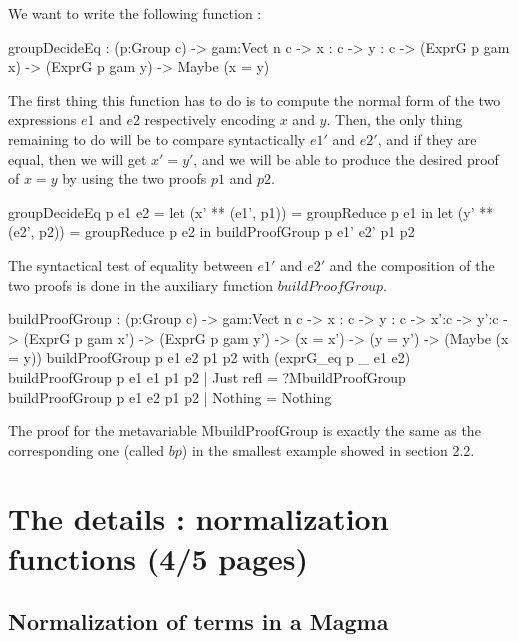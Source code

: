 \documentclass{sigplanconf}
\begin{document}
We want to write the following function :
\begin{code}[caption=Type of the function for deciding equality between elements in a Group, captionpos=b, label=lst1:haskell2]
	groupDecideEq : (p:Group c) 
	   -> {gam:Vect n c} -> {x : c} -> {y : c} 
	   -> (ExprG p gam x) -> (ExprG p gam y) 
	   -> Maybe (x = y)
\end{code}

The first thing this function has to do is to compute the normal form of the two expressions $e1$ and $e2$ respectively encoding $x$ and $y$.
Then, the only thing remaining to do will be to compare syntactically $e1'$ and $e2'$, and if they are equal, then we will get $x'=y'$, and we will be able to produce the desired proof of $x=y$ by using the two proofs $p1$ and $p2$. 

\begin{code}[caption=Decides if two elements of a group are equal, captionpos=b, label=lst1:haskell2]
groupDecideEq p e1 e2 =
  let (x' ** (e1', p1)) = 
    groupReduce p e1 in
  let (y' ** (e2', p2)) = 
    groupReduce p e2 in
	     buildProofGroup p e1' e2' p1 p2
\end{code}

The syntactical test of equality between $e1'$ and $e2'$ and the composition of the two proofs is done in the auxiliary function $buildProofGroup$. 

\begin{code}[caption=Composes the two proofs if the NF are the same, captionpos=b, label=lst1:haskell2]
buildProofGroup : (p:Group c) -> {gam:Vect n c} 
  -> {x : c} -> {y : c} -> {x':c} -> {y':c} 
  -> (ExprG p gam x') -> (ExprG p gam y') 
  -> (x = x') -> (y = y') 
  -> (Maybe (x = y))
buildProofGroup p e1 e2 p1 p2 
       with (exprG_eq p _ e1 e2)
	buildProofGroup p e1 e1 p1 p2 | Just refl = 
	         ?MbuildProofGroup
	buildProofGroup p e1 e2 p1 p2 | Nothing =
	          Nothing
\end{code}

The proof for the metavariable MbuildProofGroup is exactly the same as the corresponding one (called $bp$) in the smallest example showed in section 2.2.


\section {The details : normalization functions (4/5 pages)}

	\subsection {Normalization of terms in a Magma}
\end{document}
